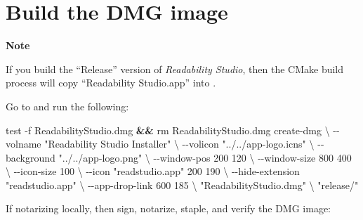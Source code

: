 \documentclass[
  letterpaper,
]{LegrandOrangeBook}
\newenvironment{Shaded}{\begin{snugshade}}{\end{snugshade}}
\newcommand{\AttributeTok}[1]{\textcolor[rgb]{0.40,0.45,0.13}{#1}}
\newcommand{\BuiltInTok}[1]{\textcolor[rgb]{0.00,0.23,0.31}{#1}}
\newcommand{\DataTypeTok}[1]{\textcolor[rgb]{0.68,0.00,0.00}{#1}}
\newcommand{\ExtensionTok}[1]{\textcolor[rgb]{0.00,0.23,0.31}{#1}}
\newcommand{\FunctionTok}[1]{\textcolor[rgb]{0.28,0.35,0.67}{#1}}
\newcommand{\KeywordTok}[1]{\textcolor[rgb]{0.00,0.23,0.31}{\textbf{#1}}}
\newcommand{\NormalTok}[1]{\textcolor[rgb]{0.00,0.23,0.31}{#1}}
\newcommand{\StringTok}[1]{\textcolor[rgb]{0.13,0.47,0.30}{#1}}
\newenvironment{notesection}
    {
    \begin{tcolorbox}[colframe=mediumblue,colback=lightblue,coltext=mediumblue,arc=3mm]
    \faEdit[regular] \textbf{Note} \newline
    }
    {
    \end{tcolorbox}
    }
\begin{document}
\newpage{}

\section*{Build the DMG image}\label{build-the-dmg-image}


\begin{notesection}
If you build the ``Release'' version of \emph{Readability Studio}, then
the CMake build process will copy ``Readability Studio.app'' into
.

\end{notesection}

Go to  and run the following:

\begin{Shaded}
\begin{Highlighting}[]
\BuiltInTok{test} \AttributeTok{{-}f}\NormalTok{ ReadabilityStudio.dmg }\KeywordTok{\&\&} \FunctionTok{rm}\NormalTok{ ReadabilityStudio.dmg}
\ExtensionTok{create{-}dmg} \DataTypeTok{\textbackslash{}}
  \AttributeTok{{-}{-}volname} \StringTok{"Readability Studio Installer"} \DataTypeTok{\textbackslash{}}
  \AttributeTok{{-}{-}volicon} \StringTok{"../../app{-}logo.icns"} \DataTypeTok{\textbackslash{}}
  \AttributeTok{{-}{-}background} \StringTok{"../../app{-}logo.png"} \DataTypeTok{\textbackslash{}}
  \AttributeTok{{-}{-}window{-}pos}\NormalTok{ 200 120 }\DataTypeTok{\textbackslash{}}
  \AttributeTok{{-}{-}window{-}size}\NormalTok{ 800 400 }\DataTypeTok{\textbackslash{}}
  \AttributeTok{{-}{-}icon{-}size}\NormalTok{ 100 }\DataTypeTok{\textbackslash{}}
  \AttributeTok{{-}{-}icon} \StringTok{"readstudio.app"}\NormalTok{ 200 190 }\DataTypeTok{\textbackslash{}}
  \AttributeTok{{-}{-}hide{-}extension} \StringTok{"readstudio.app"} \DataTypeTok{\textbackslash{}}
  \AttributeTok{{-}{-}app{-}drop{-}link}\NormalTok{ 600 185 }\DataTypeTok{\textbackslash{}}
  \StringTok{"ReadabilityStudio.dmg"} \DataTypeTok{\textbackslash{}}
  \StringTok{"release/"}
\end{Highlighting}
\end{Shaded}

If notarizing locally, then sign, notarize, staple, and verify the DMG
image:
\end{document}
